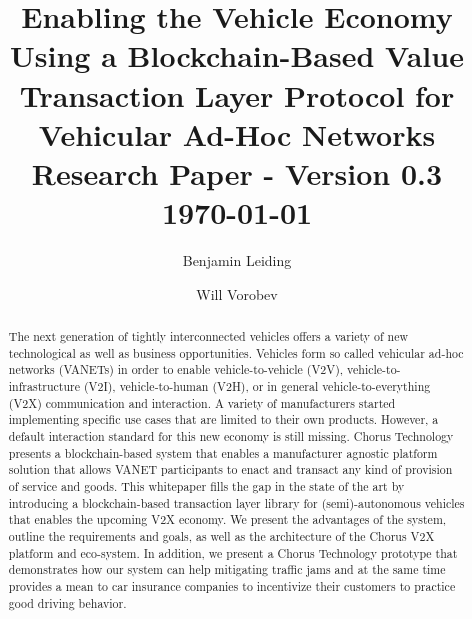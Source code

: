 \documentclass{llncs}
\begin{document}
	{
	\title{Enabling the Vehicle Economy Using a Blockchain-Based Value Transaction Layer Protocol for Vehicular Ad-Hoc Networks\\ \small Research Paper - Version 0.3\\\small \today}
	
	\author{Benjamin Leiding \and Will Vorobev}
	
	
	\maketitle


	\begin{abstract}


		The next generation of tightly interconnected vehicles offers a variety of new technological as well as  business opportunities. Vehicles form so called vehicular ad-hoc networks (VANETs) in order to enable vehicle-to-vehicle (V2V), vehicle-to-infrastructure (V2I), vehicle-to-human (V2H), or in general vehicle-to-everything (V2X) communication and interaction. A variety of manufacturers started implementing specific use cases that are limited to their own products. However, a default interaction standard for this new economy is still missing. Chorus Technology presents a blockchain-based system that enables a manufacturer agnostic platform solution that allows VANET participants to enact and transact any kind of provision of service and goods. This whitepaper fills the gap in the state of the art by introducing a blockchain-based transaction layer library for (semi)-autonomous vehicles that enables the upcoming V2X economy. We present the advantages of the system, outline the requirements and goals, as well as the architecture of the Chorus V2X platform and eco-system. In addition, we present a Chorus Technology prototype that demonstrates how our system can help mitigating traffic jams and at the same time provides a mean to car insurance companies to incentivize their customers to practice good driving behavior.
 



\end{abstract}}
\end{document}
